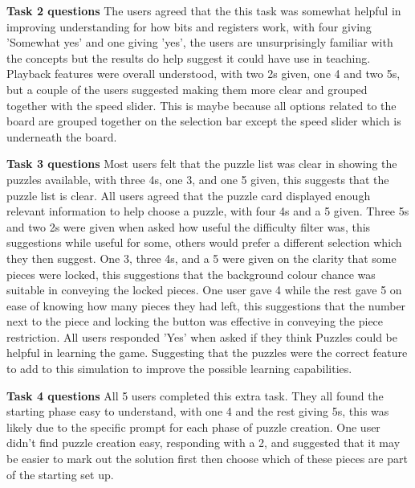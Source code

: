 \documentclass{l4proj}
\begin{document}
\textbf{Task 2 questions}
The users agreed that the this task was somewhat helpful in improving understanding for how bits and registers work, with four giving 'Somewhat yes' and one giving 'yes', the users are unsurprisingly familiar with the concepts but the results do help suggest it could have use in teaching. Playback features were overall understood, with two 2s given, one 4 and two 5s, but a couple of the users suggested making them more clear and grouped together with the speed slider. This is maybe because all options related to the board are grouped together on the selection bar except the speed slider which is underneath the board. 

\textbf{Task 3 questions}
Most users felt that the puzzle list was clear in showing the puzzles available, with three 4s, one 3, and one 5 given, this suggests that the puzzle list is clear. All users agreed that the puzzle card displayed enough relevant information to help choose a puzzle, with four 4s and a 5 given. Three 5s and two 2s were given when asked how useful the difficulty filter was, this suggestions while useful for some, others would prefer a different selection which they then suggest. One 3, three 4s, and a 5 were given on the clarity that some pieces were locked, this suggestions that the background colour chance was suitable in conveying the locked pieces. One user gave 4 while the rest gave 5 on ease of knowing how many pieces they had left, this suggestions that the number next to the piece and locking the button was effective in conveying the piece restriction. All users responded 'Yes' when asked if they think Puzzles could be helpful in learning the game. Suggesting that the puzzles were the correct feature to add to this simulation to improve the possible learning capabilities.

\textbf{Task 4 questions}
All 5 users completed this extra task. They all found the starting phase easy to understand, with one 4 and the rest giving 5s, this was likely due to the specific prompt for each phase of puzzle creation. One user didn't find puzzle creation easy, responding with a 2, and suggested that it may be easier to mark out the solution first then choose which of these pieces are part of the starting set up. 
\end{document}
